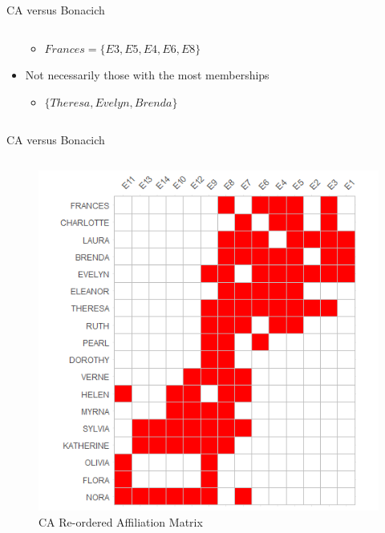 \documentclass[
  ignorenonframetext,
]{beamer}
\providecommand{\tightlist}{%
  \setlength{\itemsep}{0pt}\setlength{\parskip}{0pt}}\usepackage{longtable,booktabs,array}
\begin{document}
\begin{frame}{CA versus Bonacich}
\begin{columns}[T]
\begin{column}{0.5\textwidth}
\begin{itemize}
  \begin{itemize}
  \tightlist
  \item
    \(Frances = \{E3, E5, E4, E6, E8\}\)
  \end{itemize}
\item
  Not necessarily those with the most memberships

  \begin{itemize}
  \tightlist
  \item
    \(\{Theresa, Evelyn, Brenda\}\)
  \end{itemize}
\end{itemize}
\end{column}
\end{columns}
\end{frame}

\begin{frame}{CA versus Bonacich}
\protect\hypertarget{ca-versus-bonacich-11}{}
\begin{columns}[T]
\begin{column}{0.5\textwidth}
\begin{figure}

{\centering \includegraphics{Plots/ca-reord.png}

}

\caption{CA Re-ordered Affiliation Matrix}

\end{figure}
\end{column}


\end{columns}
\end{frame}
\end{document}
